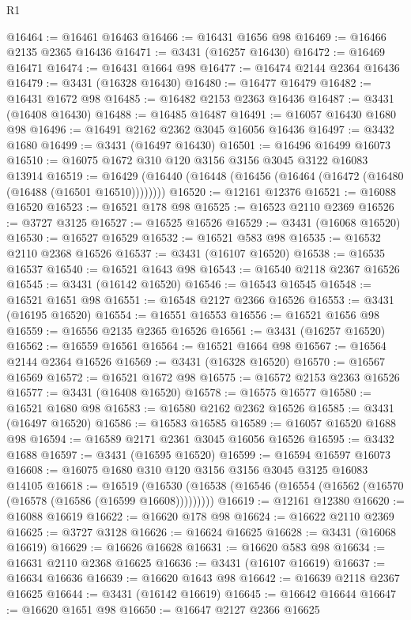 \begin{lexlean}{R1}
\begin{coremodule}
@16464 := @16461 @16463
@16466 := @16431 @1656 @98
@16469 := @16466 @2135 @2365 @16436
@16471 := @3431 (@16257 @16430)
@16472 := @16469 @16471
@16474 := @16431 @1664 @98
@16477 := @16474 @2144 @2364 @16436
@16479 := @3431 (@16328 @16430)
@16480 := @16477 @16479
@16482 := @16431 @1672 @98
@16485 := @16482 @2153 @2363 @16436
@16487 := @3431 (@16408 @16430)
@16488 := @16485 @16487
@16491 := @16057 @16430 @1680 @98
@16496 := @16491 @2162 @2362 @3045 @16056 @16436
@16497 := @3432 @1680
@16499 := @3431 (@16497 @16430)
@16501 := @16496 @16499 @16073
@16510 := @16075 @1672 @310 @120 @3156 @3156 @3045 @3122 @16083 @13914
@16519 := @16429 (@16440 (@16448 (@16456 (@16464 (@16472 (@16480 (@16488 (@16501 @16510))))))))
@16520 := @12161 @12376
@16521 := @16088 @16520
@16523 := @16521 @178 @98
@16525 := @16523 @2110 @2369
@16526 := @3727 @3125
@16527 := @16525 @16526
@16529 := @3431 (@16068 @16520)
@16530 := @16527 @16529
@16532 := @16521 @583 @98
@16535 := @16532 @2110 @2368 @16526
@16537 := @3431 (@16107 @16520)
@16538 := @16535 @16537
@16540 := @16521 @1643 @98
@16543 := @16540 @2118 @2367 @16526
@16545 := @3431 (@16142 @16520)
@16546 := @16543 @16545
@16548 := @16521 @1651 @98
@16551 := @16548 @2127 @2366 @16526
@16553 := @3431 (@16195 @16520)
@16554 := @16551 @16553
@16556 := @16521 @1656 @98
@16559 := @16556 @2135 @2365 @16526
@16561 := @3431 (@16257 @16520)
@16562 := @16559 @16561
@16564 := @16521 @1664 @98
@16567 := @16564 @2144 @2364 @16526
@16569 := @3431 (@16328 @16520)
@16570 := @16567 @16569
@16572 := @16521 @1672 @98
@16575 := @16572 @2153 @2363 @16526
@16577 := @3431 (@16408 @16520)
@16578 := @16575 @16577
@16580 := @16521 @1680 @98
@16583 := @16580 @2162 @2362 @16526
@16585 := @3431 (@16497 @16520)
@16586 := @16583 @16585
@16589 := @16057 @16520 @1688 @98
@16594 := @16589 @2171 @2361 @3045 @16056 @16526
@16595 := @3432 @1688
@16597 := @3431 (@16595 @16520)
@16599 := @16594 @16597 @16073
@16608 := @16075 @1680 @310 @120 @3156 @3156 @3045 @3125 @16083 @14105
@16618 := @16519
    (@16530 (@16538 (@16546 (@16554 (@16562 (@16570 (@16578 (@16586 (@16599 @16608)))))))))
@16619 := @12161 @12380
@16620 := @16088 @16619
@16622 := @16620 @178 @98
@16624 := @16622 @2110 @2369
@16625 := @3727 @3128
@16626 := @16624 @16625
@16628 := @3431 (@16068 @16619)
@16629 := @16626 @16628
@16631 := @16620 @583 @98
@16634 := @16631 @2110 @2368 @16625
@16636 := @3431 (@16107 @16619)
@16637 := @16634 @16636
@16639 := @16620 @1643 @98
@16642 := @16639 @2118 @2367 @16625
@16644 := @3431 (@16142 @16619)
@16645 := @16642 @16644
@16647 := @16620 @1651 @98
@16650 := @16647 @2127 @2366 @16625

\end{coremodule}
\end{lexlean}
